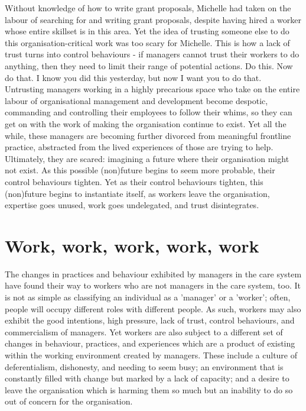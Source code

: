 Without knowledge of how to write grant proposals, Michelle had taken on the labour of searching for and writing grant proposals, despite having hired a worker whose entire skillset is in this area. Yet the idea of trusting someone else to do this organisation-critical work was too scary for Michelle. This is how a lack of trust turns into control behaviours - if managers cannot trust their workers to do anything, then they need to limit their range of potential actions. Do this. Now do that. I know you did this yesterday, but now I want you to do that. Untrusting managers working in a highly precarious space who take on the entire labour of organisational management and development become despotic, commanding and controlling their employees to follow their whims, so they can get on with the work of making the organisation continue to exist. Yet all the while, these managers are becoming further divorced from meaningful frontline practice, abstracted from the lived experiences of those are trying to help. Ultimately, they are scared: imagining a future where their organisation might not exist. As this possible (non)future begins to seem more probable, their control behaviours tighten. Yet as their control behaviours tighten, this (non)future begins to instantiate itself, as workers leave the organisation, expertise goes unused, work goes undelegated, and trust disintegrates.

\section{Work, work, work, work, work}
The changes in practices and behaviour exhibited by managers in the care system have found their way to workers who are not managers in the care system, too. It is not as simple as classifying an individual as a 'manager' or a 'worker'; often, people will occupy different roles with different people. As such, workers may also exhibit the good intentions, high pressure, lack of trust, control behaviours, and commercialism of managers. Yet workers are also subject to a different set of changes in behaviour, practices, and experiences which are a product of existing within the working environment created by managers. These include a culture of deferentialism, dishonesty, and needing to seem busy; an environment that is constantly filled with change but marked by a lack of capacity; and a desire to leave the organisation which is harming them so much but an inability to do so out of concern for the organisation.

